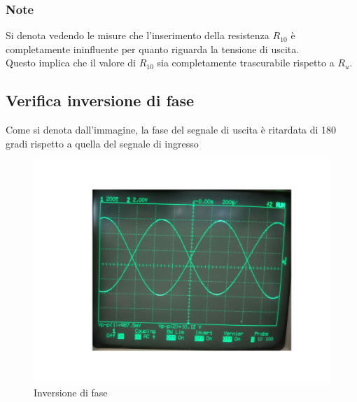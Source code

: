 \documentclass{article}
\begin{document}
\subsubsection{Note}
Si denota vedendo le misure che l'inserimento della resistenza $R_{10}$ è completamente ininfluente per quanto riguarda la tensione di uscita.\\Questo implica che il valore di $R_{10}$ sia completamente 
trascurabile rispetto a $R_{u}$.
\subsection{Verifica inversione di fase}
Come si denota dall'immagine, la fase del segnale di uscita è ritardata di 180 gradi rispetto a quella del segnale di ingresso
\begin{figure}
  \includegraphics[width=\textwidth]{fase.jpg}
  \caption{Inversione di fase}
  \label{fig:invfase1}
\end{figure}
\end{document}
